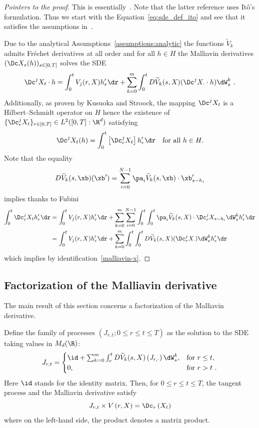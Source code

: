 \begin{proof}[Pointers to the proof]
This is essentially~\cite[Lemma~2.9]{KS1984}. Note that the latter reference uses Itô's formulation. Thus we start with the Equation~\eqref{eq:sde_def_ito} and see that it satisfies the assumptions in~\cite[Lemma~2.9]{KS1984}.

Due to the analytical Assumptions~\ref{assumptions:analytic} the functions $\widetilde{V}_k$ admits Fréchet derivatives at all order and for all $h\in H$ the Malliavin derivatives $(\Dc X_s(h))_{s\in [0,T]}$ solves the SDE
\begin{equation}
\Dc^j X_t \cdot h = \int_0^t {V}_j(r,X)h'_r \dr+\sum_{k=0}^m \int_0^t D\widetilde{V}_k(s,X)(\Dc^j X_\cdot \cdot h) \dW_s^k \ .
\end{equation}
Additionally, as proven by Kusuoka and Stroock, the mapping $\Dc^j X_t$ is a Hilbert--Schmidt operator on $H$ hence the existence of $\{\Dc_r^j X_t\}_{r\in[0,T]}\in L^2([0,T]:\R^d)$ satisfying
\[
\Dc^j X_t(h)=\int_0^t \left[\Dc_r^j X_t \right] h'_r \dr \quad\text{for all }h\in H.
\]
Note that the equality
\[
D\widetilde{V}_k(s,\xb)(\xb') = \sum_{i=0}^{N-1} \pa_i \widetilde V_k (s,\xb) \cdot \xb'_{s-h_i}
\]
implies thanks to Fubini
\begin{align*}
\int_0^t \Dc^j_r X_t h'_r \dr&=\int_0^t {V}_j(r,X)h'_r \dr+\sum_{k=0}^m\sum_{i=0}^{N-1} \int_0^t\int_0^t \pa_i\widetilde{V}_k(s,X) \cdot \Dc^j_r X_{s-h_i} \dW_s^k h'_r\dr\\
&=\int_0^t {V}_j(r,X)h'_r \dr + \sum_{k=0}^m \int_0^t\int_0^t D\widetilde{V}_k(s,X) (\Dc^j_r X_\cdot) \dW_s^k h'_r\dr
\end{align*}
which implies by identification~\eqref{malliavin-x}.
\end{proof}

\subsection{Factorization of the Malliavin derivative}

The main result of this section concerns a factorization of the Malliavin derivative.

\begin{prop}\label{proposition:malliavin_derivative_expr}
Define the family of processes $\left(J_{r,t} ; 0 \leq r \leq t \leq T \right)$ as the solution to the SDE taking values in $M_d(\R)$:
\begin{equation}\label{eq:flow1}
J_{r,t} =
\begin{cases}
\id + \sum_{k=0}^m \int_{r}^t D\widetilde{V}_k (s,X)\left(J_{r, \cdot} \right) \dW_s^k,& \text{for } r \leq t, \\
0, &\text{for } r > t \ .
\end{cases}
\end{equation}
Here $\id$ stands for the identity matrix. Then, for $0\leq r \leq t\leq T$, the tangent process and the Malliavin derivative satisfy
\begin{equation}\label{equation-tangent-malliavin}
J_{r, t} \times V\left(r,X \right) = \Dc_r \left(X_t \right)
\end{equation}
where on the left-hand side, the product denotes a matrix product.
\end{prop}


